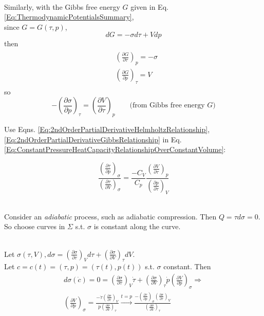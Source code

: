 \quad \\ 
Similarly, with the Gibbs free energy $G$ given in Eq. \ref{Eq:ThermodynamicPotentialsSummary}, \\
since $G=G(\tau, p)$, 
\[
dG = -\sigma d\tau + Vdp
\]
then 
\[
\begin{gathered}
	\begin{aligned}
		& \left( \frac{\partial G}{\partial \tau} \right)_p = -\sigma \\ 
		& \left( \frac{ \partial G}{\partial p} \right)_{\tau} = V
	\end{aligned} 
\end{gathered}
\]
so 
\begin{equation}\label{Eq:2ndOrderPartialDerivativeGibbsRelationship}
-\left( \frac{ \partial \sigma}{ \partial p} \right)_{\tau} = \left(\frac{\partial V}{\partial \tau } \right)_p \qquad \text{(from Gibbs free energy $G$)}
\end{equation}

Use Eqns. \ref{Eq:2ndOrderPartialDerivativeHelmholtzRelationship}, \ref{Eq:2ndOrderPartialDerivativeGibbsRelationship} in Eq. \ref{Eq:ConstantPressureHeatCapacityRelationshipOverConstantVolume}:

\begin{equation}\label{Eq:ConstantPressureHeatCapacityRelationshipOverConstantVolume2}
\frac{ \left( \frac{\partial \tau}{\partial p}\right)_{\sigma} }{ \left( \frac{\partial \tau}{\partial V}\right)_{\sigma} } = \frac{-C_V}{C_p} \frac{ \left( \frac{\partial V}{\partial \tau}\right)_p }{ \left( \frac{\partial p}{\partial \tau}\right)_V } 
\end{equation}

\quad \\ 
Consider an \emph{adiabatic} process, such as adiabatic compression. Then $Q = \tau d\sigma = 0$. So choose curves in $\Sigma$ s.t. $\sigma$ is constant along the curve.

\quad \\
Let $\sigma(\tau, V), d\sigma = \left( \frac{\partial \sigma}{\partial \tau} \right)_V d\tau + \left( \frac{\partial \sigma}{\partial V} \right)_{\tau} dV$. \\
Let $c=c(t)= (\tau, p) = (\tau(t), p(t))$ s.t. $\sigma$ constant. Then
\begin{equation}\label{Eq:AdiabaticDifferentialRelationship1}
\begin{gathered}
d\sigma(\dot{c}) = 0 = \left( \frac{\partial \sigma}{\partial \tau} \right)_V \dot{\tau} + \left( \frac{\partial \sigma}{\partial V} \right)_{\tau} \dot{p} \left( \frac{\partial V}{ \partial p } \right)_{\sigma} \Longrightarrow \\
\left( \frac{\partial V}{\partial p} \right)_{\sigma} = \frac{ - \dot{\tau} \left( \frac{\partial \sigma}{\partial \tau} \right)_V }{ \dot{p} \left( \frac{\partial \sigma}{\partial V} \right)_{\tau} }\xrightarrow{t = p} \frac{ - \left( \frac{\partial \tau}{\partial p} \right)_{\sigma} \left( \frac{\partial \sigma}{\partial \tau}\right)_V }{ \left( \frac{\partial \sigma}{\partial V}\right)_{\tau} } 
\end{gathered}
\end{equation}
 
